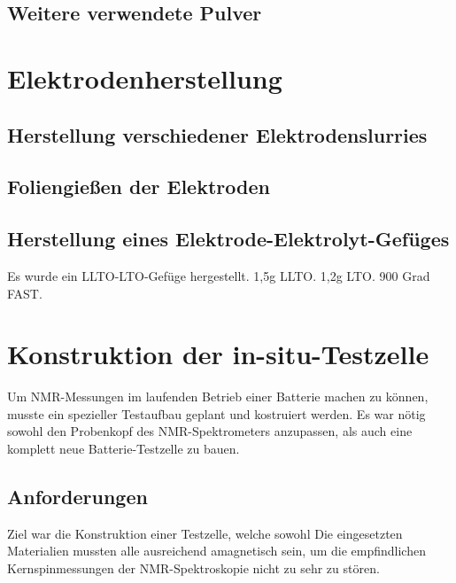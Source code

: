 \documentclass[a4paper, 11pt, headsepline,footsepline,twoside,abstract]{scrbook}
\begin{document}
\subsection{Weitere verwendete Pulver}
\section{Elektrodenherstellung}
\subsection{Herstellung verschiedener Elektrodenslurries}
\subsection{Foliengießen der Elektroden}
\subsection{Herstellung eines Elektrode-Elektrolyt-Gefüges}
Es wurde ein LLTO-LTO-Gefüge hergestellt. 1,5g LLTO. 1,2g LTO. 900 Grad FAST.
\section{Konstruktion der in-situ-Testzelle}
Um NMR-Messungen im laufenden Betrieb einer Batterie machen zu können, musste ein spezieller Testaufbau geplant und kostruiert werden. Es war nötig sowohl den Probenkopf des NMR-Spektrometers anzupassen, als auch eine komplett neue Batterie-Testzelle zu bauen.
\subsection{Anforderungen}
Ziel war die Konstruktion einer Testzelle, welche sowohl Die eingesetzten Materialien mussten alle ausreichend amagnetisch sein, um die empfindlichen Kernspinmessungen der NMR-Spektroskopie nicht zu sehr zu stören. 
\end{document}

